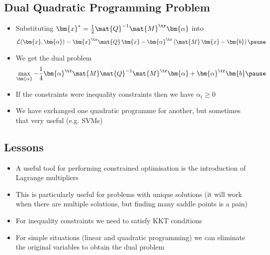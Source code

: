 
\begin{slide}
\section{Dual Quadratic Programming Problem}

\begin{PauseHighLight}
  \begin{itemize}
  \item Substituting $\bm{x}^* = \frac{1}{2} \mat{Q}^{-1} \mat{M}^\tr
    \bm{\alpha}$ into
    \begin{align*}
      \mathcal{L}(\bm{x},\bm{\alpha}) = \bm{x}^\tr \mat{Q}\, \bm{x} -
      \bm{\alpha}^\tr \left( \mat{M}\,\bm{x} - \bm{b}\right)\pause
    \end{align*}
  \item We get the dual problem
    \begin{align*}
      \max_{\bm{\alpha}}
      -\frac{1}{4} \bm{\alpha}^\tr \mat{M} \mat{Q}^{-1} \mat{M}^\tr
      \bm{\alpha} + \bm{\alpha}^\tr \bm{b}\pause
    \end{align*}
  \item If the constraints were inequality constraints then we have
    $\alpha_i\geq 0$\pause
  \item We have exchanged one quadratic programme for another, but
    sometimes that very useful (e.g. SVMs)\pause    
  \end{itemize}
\end{PauseHighLight}

\end{slide}


\begin{slide}
\section{Lessons}
\label{last}

\begin{PauseHighLight}
  \begin{itemize}
  \item A useful tool for performing constrained optimisation is the
    introduction of Lagrange multipliers\pause
  \item This is particularly useful for problems with unique solutions
    (it will work when there are multiple solutions, but
    finding many saddle points is a pain)\pause
  \item For inequality constraints we need to satisfy KKT conditions\pause
  \item For simple situations (linear and quadratic programming) we can
    eliminate the original variables to obtain the dual problem\pause
  \end{itemize}
\end{PauseHighLight}

\end{slide}



